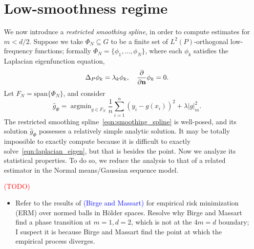 \documentclass{article}
\newcommand{\1}{\mathbf{1}}
\DeclareMathOperator*{\argmin}{argmin}
\newcommand{\wh}[1]{\widehat{#1}}
\theoremstyle{alden}
\theoremstyle{aldenthm}
\theoremstyle{definition}
\theoremstyle{remark}
\begin{document}
\section{Low-smoothness regime}
We now introduce a \emph{restricted smoothing spline}, in order to compute estimates for $m < d/2$. Suppose we take $\Phi_N \subseteq G$ to be a finite set of $L^2(P)$-orthogonal low-frequency functions; formally $\Phi_N = \{\phi_1,\ldots,\phi_N\}$, where each $\phi_k$ satisfies the Laplacian eigenfunction equation,
\begin{equation}
\label{eqn:laplacian_eigen}
\Delta_P \phi_k = \lambda_k \phi_k,\quad \frac{\partial}{\partial {\bf n}}\phi_k = 0.
\end{equation}
Let $F_N = \mathrm{span}\{\Phi_N\}$, and consider
\begin{equation}
\label{eqn:restricted_smoothing_spline}
\wh{g}_{\Phi} = \argmin_{g \in F_N} \frac{1}{n} \sum_{i = 1}^{n} (y_i - g(x_i))^2 + \lambda |g|_{m}^2.
\end{equation}
The restricted smoothing spline~\eqref{eqn:smoothing_spline} is well-posed, and its solution $\wh{g}_{\Phi}$ possesses a relatively simple analytic solution. It may be totally impossible to exactly compute because it is difficult to exactly solve~\eqref{eqn:laplacian_eigen}, but that is besides the point. Now we analyze its statistical properties. To do so, we reduce the analysis to that of a related estimator in the Normal means/Gaussian sequence model.

\textcolor{red}{(TODO)}
\begin{itemize}
	\item Refer to the results of \textcolor{blue}{(Birge and Massart)} for empirical risk minimization (ERM) over normed balls in H\"{o}lder spaces. Resolve why Birge and Massart find a phase transition at $m = 1, d = 2$, which is not at the $4m = d$ boundary; I suspect it is because Birge and Massart find the point at which the empirical process diverges.
\end{itemize}
\end{document}
